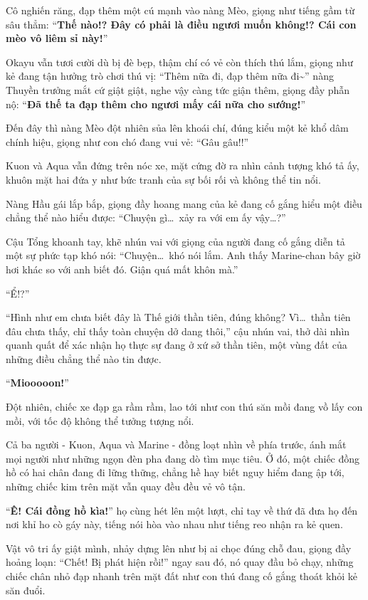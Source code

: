 \documentclass[../main.tex]{subfiles}
\begin{document}

Cô nghiến răng, đạp thêm một cú mạnh vào nàng Mèo, giọng như tiếng gầm từ sâu thẳm: ``\textbf{Thế nào!? Đây có phải là điều ngươi muốn không!? Cái con mèo vô liêm sỉ này!}''

Okayu vẫn tươi cười dù bị đè bẹp, thậm chí có vẻ còn thích thú lắm, giọng như kẻ đang tận hưởng trò chơi thú vị: ``Thêm nữa đi, đạp thêm nữa đi\~{}'' nàng Thuyền trưởng mắt cứ giật giật, nghe vậy càng tức giận thêm, giọng đầy phẫn nộ: ``\textbf{Đã thế ta đạp thêm cho ngươi mấy cái nữa cho sướng!}''

Đến đây thì nàng Mèo đột nhiên sủa lên khoái chí, đúng kiểu một kẻ khổ dâm chính hiệu, giọng như con chó đang vui vẻ: ``Gâu gâu!!''

Kuon và Aqua vẫn đứng trên nóc xe, mặt cứng đờ ra nhìn cảnh tượng khó tả ấy, khuôn mặt hai đứa y như bức tranh của sự bối rối và không thể tin nổi.

Nàng Hầu gái lắp bắp, giọng đầy hoang mang của kẻ đang cố gắng hiểu một điều chẳng thể nào hiểu được: ``Chuyện gì\dots\ xảy ra với em ấy vậy\dots?''

Cậu Tổng khoanh tay, khẽ nhún vai với giọng của người đang cố gắng diễn tả một sự phức tạp khó nói: ``Chuyện\dots\ khó nói lắm. Anh thấy Marine-chan bây giờ hơi khác so với anh biết đó. Giận quá mất khôn mà.''

``Ể!?''

``Hình như em chưa biết đây là Thế giới thần tiên, đúng không? Vì\dots\ thần tiên đâu chưa thấy, chỉ thấy toàn chuyện dở dang thôi,'' cậu nhún vai, thở dài nhìn quanh quất để xác nhận họ thực sự đang ở xứ sở thần tiên, một vùng đất của những điều chẳng thể nào tin được.

``\textbf{Miooooon!}''

Đột nhiên, chiếc xe đạp ga rầm rầm, lao tới như con thú săn mồi đang vồ lấy con mồi, với tốc độ không thể tưởng tượng nổi.

Cả ba người - Kuon, Aqua và Marine - đồng loạt nhìn về phía trước, ánh mắt mọi người như những ngọn đèn pha đang dò tìm mục tiêu. Ở đó, một chiếc đồng hồ có hai chân đang đi lững thững, chẳng hề hay biết nguy hiểm đang ập tới, những chiếc kim trên mặt vẫn quay đều đều vẻ vô tận.

``\textbf{Ê! Cái đồng hồ kìa!}'' họ cùng hét lên một lượt, chỉ tay về thứ đã đưa họ đến nơi khỉ ho cò gáy này, tiếng nói hòa vào nhau như tiếng reo nhận ra kẻ quen.


Vật vô tri ấy giật mình, nhảy dựng lên như bị ai chọc đúng chỗ đau, giọng đầy hoảng loạn: ``Chết! Bị phát hiện rồi!'' ngay sau đó, nó quay đầu bỏ chạy, những chiếc chân nhỏ đạp nhanh trên mặt đất như con thú đang cố gắng thoát khỏi kẻ săn đuổi.
\end{document}

